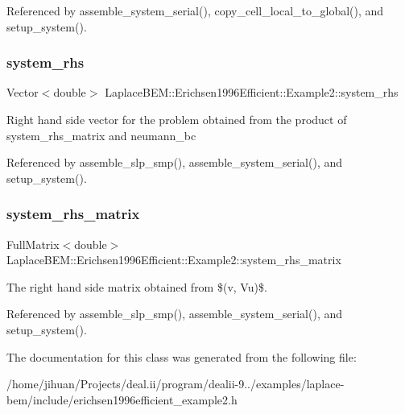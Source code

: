 Referenced by assemble\+\_\+system\+\_\+serial(), copy\+\_\+cell\+\_\+local\+\_\+to\+\_\+global(), and setup\+\_\+system().

\mbox{\label{classLaplaceBEM_1_1Erichsen1996Efficient_1_1Example2_a7de5f9e1f110ec7f842577a54dddd267}} 
\subsubsection{\texorpdfstring{system\+\_\+rhs}{system\_rhs}}
{\footnotesize\ttfamily Vector$<$double$>$ Laplace\+B\+E\+M\+::\+Erichsen1996\+Efficient\+::\+Example2\+::system\+\_\+rhs\hspace{0.3cm}{\ttfamily [private]}}

Right hand side vector for the problem obtained from the product of {\ttfamily system\+\_\+rhs\+\_\+matrix} and {\ttfamily neumann\+\_\+bc} 

Referenced by assemble\+\_\+slp\+\_\+smp(), assemble\+\_\+system\+\_\+serial(), and setup\+\_\+system().

\mbox{\label{classLaplaceBEM_1_1Erichsen1996Efficient_1_1Example2_a13e4add9320ecede8e53b7a633805740}} 
\subsubsection{\texorpdfstring{system\+\_\+rhs\+\_\+matrix}{system\_rhs\_matrix}}
{\footnotesize\ttfamily Full\+Matrix$<$double$>$ Laplace\+B\+E\+M\+::\+Erichsen1996\+Efficient\+::\+Example2\+::system\+\_\+rhs\+\_\+matrix\hspace{0.3cm}{\ttfamily [private]}}

The right hand side matrix obtained from \$(v, Vu)\$. 

Referenced by assemble\+\_\+slp\+\_\+smp(), assemble\+\_\+system\+\_\+serial(), and setup\+\_\+system().



The documentation for this class was generated from the following file\+:\begin{DoxyCompactItemize}
\item 
/home/jihuan/\+Projects/deal.\+ii/program/dealii-\/9../examples/laplace-\/bem/include/erichsen1996efficient\+\_\+example2.\+h\end{DoxyCompactItemize}
